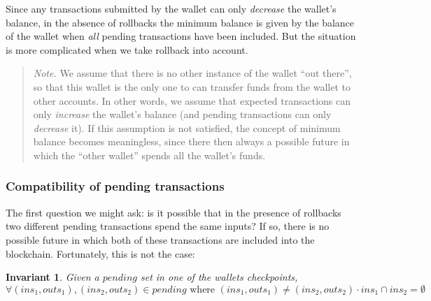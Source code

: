 \documentclass{article}
\newtheorem{invariant}{Invariant}
\begin{document}
Since any transactions submitted by the wallet can only \emph{decrease} the
wallet's balance, in the absence of rollbacks the minimum balance is given
by the balance of the wallet when \emph{all} pending transactions have been
included. But the situation is more complicated when we take rollback into
account.

\begin{quote}
\emph{Note.} We assume that there is no other instance of the wallet
``out there'', so that this wallet is the only one to can transfer funds
from the wallet to other accounts. In other words, we assume that expected
transactions can only \emph{increase} the wallet's balance (and pending
transactions can only \emph{decrease} it). If this assumption is not satisfied,
the concept of minimum balance becomes meaningless, since there then always
a possible future in which the ``other wallet'' spends all the wallet's funds.
\end{quote}

\subsubsection{Compatibility of pending transactions}

The first question we might ask: is it possible that in the presence of
rollbacks two different pending transactions spend the same inputs? If so, there
is no possible future in which both of these transactions are included into the
blockchain. Fortunately, this is not the case:

\begin{invariant}
Given a $\mathit{pending}$ set in one of the wallets checkpoints,
\begin{equation*}
\forall (\mathit{ins}_1, \mathit{outs}_1), (\mathit{ins}_2, \mathit{outs}_2) \in \mathit{pending} \text{ where } (\mathit{ins}_1, \mathit{outs}_1) \ne (\mathit{ins}_2, \mathit{outs}_2) \cdot
\mathit{ins}_1 \cap \mathit{ins}_2 = \emptyset
\end{equation*}
\end{invariant}
\end{document}
